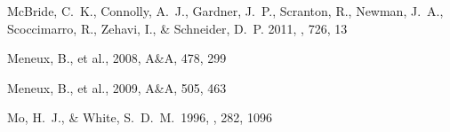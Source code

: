 \documentclass[]{emulateapj}
\begin{document}
\begin{thebibliography}{999}
McBride, C.\ K., Connolly, A.\ J., Gardner, J.\ P., Scranton, R.,
Newman, J.\ A., Scoccimarro, R., Zehavi, I., \& Schneider, D.\ P.
2011, \apj, 726, 13 %






Meneux, B., et al., 2008,
A\&A, 478, 299 %

Meneux, B., et al., 2009,
A\&A, 505, 463 %



Mo, H.\ J., \& White, S.\ D.\ M.\ 1996, \mnras, 282, 1096



\end{thebibliography}
\end{document}
